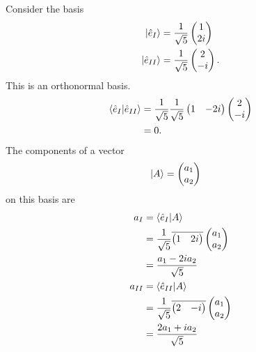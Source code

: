 \documentclass[10pt]{mypackage}
\begin{document}
\begin{example}
  Consider the basis
  \begin{align*}
    \ket{\hat{e}_{I}} &= \frac{1}{\sqrt{5}} \begin{pmatrix}1\\2i\end{pmatrix}\\
    \ket{\hat{e}_{II}} &= \frac{1}{\sqrt{5}} \begin{pmatrix}2\\ -i\end{pmatrix}.
  \end{align*}
  This is an orthonormal basis.
  \begin{align*}
    \braket{\hat{e}_{I}}{\hat{e}_{II}} &= \frac{1}{\sqrt{5}}\frac{1}{\sqrt{5}} \begin{pmatrix}1 & -2i\end{pmatrix} \begin{pmatrix}2\\-i\end{pmatrix}\\
                                       &= 0.
  \end{align*}
  The components of a vector
  \begin{align*}
    \ket{A} &= \begin{pmatrix}a_1\\a_2\end{pmatrix}
  \end{align*}
  on this basis are
  \begin{align*}
    a_{I} &= \braket{\hat{e}_{I}}{A}\\
          &= \frac{1}{\sqrt{5}} \overline{ \begin{pmatrix}1 & 2i\end{pmatrix} } \begin{pmatrix}a_1\\a_2\end{pmatrix}\\
          &= \frac{a_1 - 2ia_2}{\sqrt{5}}\\
    a_{II} &= \braket{\hat{e}_{II}}{A}\\
           &= \frac{1}{\sqrt{5}} \overline{ \begin{pmatrix}2 & -i\end{pmatrix} } \begin{pmatrix}a_1\\a_2\end{pmatrix}\\
           &= \frac{2a_1 + ia_2}{\sqrt{5}}\\

\end{align*}
\end{example}
\end{document}
